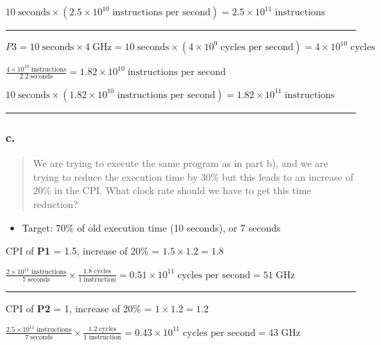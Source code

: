\documentclass[]{article}
\begin{document}
\(10 \;\text{seconds} \times (2.5 \times 10^{10} \;\text{instructions per second}) = 2.5 \times 10^{11} \;\text{instructions}\)

\begin{center}\rule{0.5\linewidth}{\linethickness}\end{center}

\(P3 = 10 \; \text{seconds} \times 4 \; \text{GHz} = 10 \; \text{seconds} \times (4 \times 10^9 \; \text{cycles per second}) = 4 \times 10^{10} \; \text{cycles}\)

\(\frac{4 \times 10^{10} \; \text{instructions}}{2.2 \; \text{seconds}} = 1.82 \times 10^{10} \; \text{instructions per second}\)

\(10 \;\text{seconds} \times (1.82 \times 10^{10} \;\text{instructions per second}) = 1.82 \times 10^{11} \;\text{instructions}\)

\begin{center}\rule{0.5\linewidth}{\linethickness}\end{center}

\subsubsection{c.}\label{header-n4767}

\begin{quote}
We are trying to execute the same program as in part b), and we are
trying to reduce the execution time by 30\% but this leads to an
increase of 20\% in the CPI. What clock rate should we have to get this
time reduction?
\end{quote}

\begin{itemize}
\item
  Target: 70\% of old execution time (10 seconds), or 7 seconds
\end{itemize}

CPI of \textbf{P1} = 1.5, increase of 20\% = \(1.5 \times 1.2 = 1.8\)

\(\frac{2 \times 10^{11} \;\text{instructions}}{7 \;\text{seconds}} \times \frac{1.8 \;\text{cycles}}{1 \;\text{instruction}} = 0.51 \times 10^{11} \;\text{cycles per second} = 51 \; \text{GHz}\)

\begin{center}\rule{0.5\linewidth}{\linethickness}\end{center}

CPI of \textbf{P2} = 1, increase of 20\% = \(1 \times 1.2 = 1.2\)

\(\frac{2.5 \times 10^{11} \;\text{instructions}}{7 \;\text{seconds}} \times \frac{1.2 \;\text{cycles}}{1 \;\text{instruction}} = 0.43 \times 10^{11} \;\text{cycles per second} = 43 \; \text{GHz}\)
\end{document}
